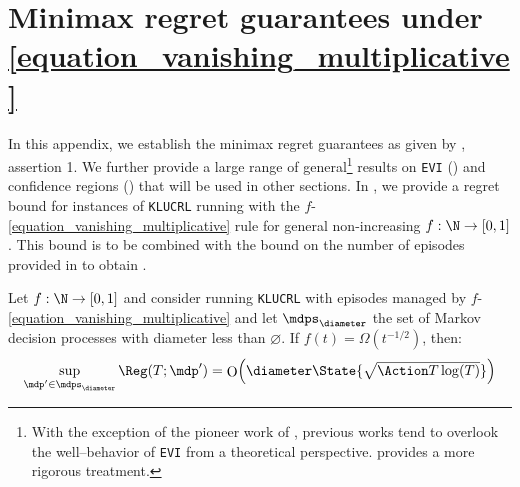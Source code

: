 \documentclass[preprint,cleveref,12pt]{colt2025}
\newenvironment{blackblock}{
    \begin{tcolorbox}[
        enhanced,
        breakable,
        colback=black!10,
        leftrule=1mm,
        toprule=0pt,
        bottomrule=0pt,
        rightrule=0pt,
        arc=0pt,
        before skip=1em plus 2pt,
        after skip=1em plus 2pt,
    ]
}{
    \end{tcolorbox}
}
\DeclarePairedDelimiter{\parens}{(}{)}	%
\newcommand{\tsqrt}[1]{{\textstyle\sqrt{#1}}} %
\DeclareMathOperator*{\OH}{\mathrm{O}}
\def\model{\mdp}
\def\models{\mdps}
\begin{document}
    \clearpage
    \section{Minimax regret guarantees under \eqref{equation_vanishing_multiplicative}}
    \label{appendix_minimax}

    In this appendix, we establish the minimax regret guarantees as given by , assertion 1.
    We further provide a large range of general\footnote{With the exception of the pioneer work of \cite{auer_near_optimal_2009}, previous works tend to overlook the well--behavior of \texttt{EVI} from a theoretical perspective.  provides a more rigorous treatment.} results on \texttt{EVI} () and confidence regions () that will be used in other sections.  
    In , we provide a regret bound for instances of \texttt{KLUCRL} running with the $f$-\eqref{equation_vanishing_multiplicative} rule for general non-increasing $f : \N \to [0, 1]$.
    This bound is to be combined with the bound on the number of episodes provided in  to obtain .

    \begin{blackblock}
        \begin{theorem}
        \label{theorem_minimax_regret}
            Let $f : \N \to [0, 1]$ and consider running \texttt{KLUCRL} with episodes managed by $f$-\eqref{equation_vanishing_multiplicative} and let $\models_\diameter$ the set of Markov decision processes with diameter less than $\diameter$. 
            If $f(t) = \Omega(t^{-1/2})$, then:
            \begin{equation*}
                \sup_{\model' \in \models_\diameter} \Reg(T; \model')
                =
                \OH \parens*{
                    \diameter \State \tsqrt{\Action T \log(T)}
                }
            \end{equation*}
        \end{theorem}
    \end{blackblock}
\end{document}
